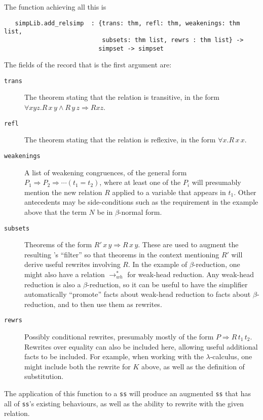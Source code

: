 {The function achieving all this is
\begin{verbatim}
   simpLib.add_relsimp  : {trans: thm, refl: thm, weakenings: thm list,
                           subsets: thm list, rewrs : thm list} ->
                          simpset -> simpset
\end{verbatim}
The fields of the record that is the first argument are:
\begin{description}
\item[\texttt{trans}] The theorem stating that the relation is
  transitive, in the form $\forall x y z. R\,x\,y \land R\,y\,z \Rightarrow R x z$.
\item[\texttt{refl}] The theorem stating that the relation is
  reflexive, in the form $\forall x. R\,x\,x$.
\item[\texttt{weakenings}] A list of weakening congruences, of the
  general form $P_1 \Rightarrow P_2 \Rightarrow \cdots (t_1 = t_2)$, where at least one of the
  $P_i$ will presumably mention the new relation $R$ applied to a
  variable that appears in $t_1$.  Other
  antecedents may be side-conditions such as the requirement in the
  example above that the term $N$ be in $\beta$-normal form.
\item[\texttt{subsets}] Theorems of the form $R'\,x\,y \Rightarrow R\,x\,y$.
  These are used to augment the resulting \simpset's ``filter'' so that
  theorems in the context mentioning $R'$ will derive useful rewrites
  involving $R$.  In the example of $\beta$-reduction, one might also have
  a relation $\rightarrow_{wh}^*$ for weak-head reduction.  Any weak-head
  reduction is also a $\beta$-reduction, so it can be useful to have the
  simplifier automatically ``promote'' facts about weak-head reduction
  to facts about $\beta$-reduction, and to then use them as rewrites.
\item[\texttt{rewrs}] Possibly conditional rewrites, presumably mostly
  of the form $P \Rightarrow R\,t_1\,t_2$.  Rewrites over equality can also be
  included here, allowing useful additional facts to be included.  For
  example, when working with the $\lambda$-calculus, one might include both
  the rewrite for $K$ above, as well as the definition of
  substitution.
\end{description}
} %

The application of this function to a \simpset{} \texttt{ss} will
produce an augmented \texttt{ss} that has all of \texttt{ss}'s
existing behaviours, as well as the ability to rewrite with the given
relation.


